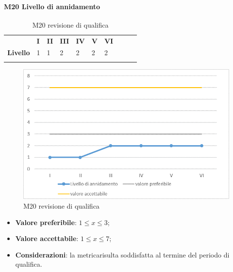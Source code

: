 \paragraph{M20 Livello di annidamento} \mbox{}
\begin{longtable}[H!] {						
		>{}p{50mm}  		
		>{}p{8mm}
		>{}p{8mm}		
		>{}p{8mm}		
		>{}p{8mm}		
		>{}p{8mm}		
		>{}p{8mm}
		>{}p{8mm}
		>{}p{8mm}
		>{}p{8mm}
	}
	\rowcolor{gray!50}
	\textbf{} & \textbf{I} & \textbf{II} & \textbf{III} & \textbf{IV} & \textbf{V} & \textbf{VI} \TBstrut \\ [2mm]
	\textbf{Livello} & 1 & 1 & 2 & 2 & 2 & 2 \TBstrut \\ [2mm]
	\rowcolor{white}
	\caption{M20 revisione di qualifica}
\end{longtable}
\begin{figure}[H] 	
	\includegraphics[width=\linewidth]{./img/grafici/RQ20.png}	
	\caption{M20 revisione di qualifica}	
\end{figure}
\begin{itemize}
	\item \textbf{Valore preferibile}: $1\le x \le 3$;
	\item \textbf{Valore accettabile}: $1 \le x \le 7$;
	\item \textbf{Considerazioni}: la metrica\glosp risulta soddisfatta al termine del periodo di qualifica.
\end{itemize}

